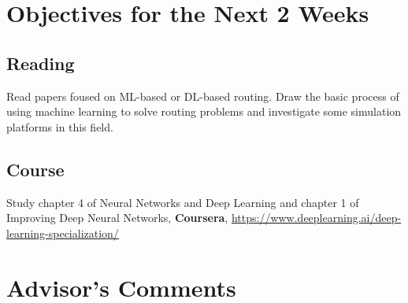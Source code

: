 \documentclass[11pt]{report}
\begin{document}
	\section{Objectives for the Next 2 Weeks}
	\subsection{Reading} 
	Read papers foused on ML-based or DL-based routing. Draw the basic process of using machine learning to solve routing problems and investigate some simulation platforms in this field.
	\subsection{Course} 
	Study chapter 4 of Neural Networks and Deep Learning and chapter 1 of Improving Deep Neural Networks, \textbf{Coursera}, \url{https://www.deeplearning.ai/deep-learning-specialization/}
	
	\section{Advisor's Comments}
	
	
	
	
\end{document}
